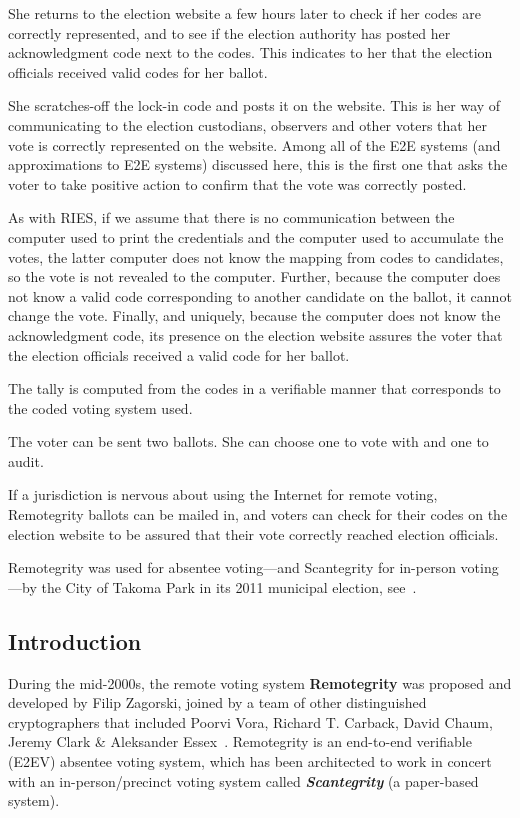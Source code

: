 She returns to the election website a few hours later to check if her
codes are correctly represented, and to see if the election authority
has posted her acknowledgment code next to the codes. This indicates
to her that the election officials received valid codes for her
ballot.

She scratches-off the lock-in code and posts it on the website. This
is her way of communicating to the election custodians, observers and
other voters that her vote is correctly represented on the
website. Among all of the E2E systems (and approximations to E2E
systems) discussed here, this is the first one that asks the voter to
take positive action to confirm that the vote was correctly posted.

As with RIES, if we assume that there is no communication between the
computer used to print the credentials and the computer used to
accumulate the votes, the latter computer does not know the mapping
from codes to candidates, so the vote is not revealed to the
computer. Further, because the computer does not know a valid code
corresponding to another candidate on the ballot, it cannot change the
vote. Finally, and uniquely, because the computer does not know the
acknowledgment code, its presence on the election website assures the
voter that the election officials received a valid code for her
ballot.

The tally is computed from the codes in a verifiable manner that
corresponds to the coded voting system used.

The voter can be sent two ballots. She can choose one to vote with and
one to audit.

If a jurisdiction is nervous about using the Internet for remote
voting, Remotegrity ballots can be mailed in, and voters can check for
their codes on the election website to be assured that their vote
correctly reached election officials.

Remotegrity was used for absentee voting---and Scantegrity for
in-person voting---by the City of Takoma Park in its 2011 municipal
election, see~\cite{zagorski2013}.

\subsection{Introduction}

During the mid-2000s, the remote voting system \textbf{Remotegrity
}was proposed and developed by Filip Zagorski, joined by a team of
other distinguished cryptographers that included Poorvi Vora, Richard
T. Carback, David Chaum, Jeremy Clark \& Aleksander
Essex~\cite{zagorski2013}. Remotegrity is an end-to-end verifiable
(E2EV) absentee voting system, which has been architected to work in
concert with an in-person/precinct voting system called
\textbf{\textit{Scantegrity }}(a paper-based system).

